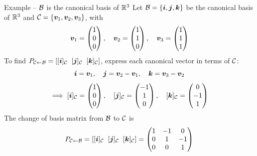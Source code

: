 \documentclass[aspectratio=169]{beamer}\usepackage[]{graphicx}\usepackage[]{xcolor}
\begin{document}
\begin{frame}{Example -- $\mathcal{B}$ is the canonical basis of $\mathbb{R}^3$}
Let $\mathcal{B}=\{\bm{i},\bm{j},\bm{k}\}$ be the canonical basis of $\mathbb{R}^3$ and $\mathcal{C}=\{\bm{v}_1,\bm{v}_2,\bm{v}_3\}$, with
\[
\bm{v}_1 = \begin{pmatrix} 1 \\ 0 \\ 0 \end{pmatrix}, \quad
\bm{v}_2 = \begin{pmatrix} 1 \\ 1 \\ 0 \end{pmatrix}, \quad
\bm{v}_3 = \begin{pmatrix} 1 \\ 1 \\ 1 \end{pmatrix}
\]
\vfill
To find $P_{\mathcal{C}\leftarrow\mathcal{B}} = [[\bm{i}]_{\mathcal{C}} \;\; [\bm{j}]_{\mathcal{C}} \;\; [\bm{k}]_{\mathcal{C}}]$, express each canonical vector in terms of $\mathcal{C}$:
\[
\bm{i} = \bm{v}_1, \quad
\bm{j} = \bm{v}_2 - \bm{v}_1, \quad
\bm{k} = \bm{v}_3 - \bm{v}_2
\]
\[
\implies [\bm{i}]_{\mathcal{C}} = \begin{pmatrix} 1 \\ 0 \\ 0 \end{pmatrix}, \quad
[\bm{j}]_{\mathcal{C}} = \begin{pmatrix} -1 \\ 1 \\ 0 \end{pmatrix}, \quad
[\bm{k}]_{\mathcal{C}} = \begin{pmatrix} 0 \\ -1 \\ 1 \end{pmatrix}
\]
\vfill
The change of basis matrix from $\mathcal{B}$ to $\mathcal{C}$ is
\[
P_{\mathcal{C}\leftarrow\mathcal{B}} = [[\bm{i}]_{\mathcal{C}} \;\; [\bm{j}]_{\mathcal{C}} \;\; [\bm{k}]_{\mathcal{C}}] = \begin{pmatrix} 1 & -1 & 0 \\ 0 & 1 & -1 \\ 0 & 0 & 1 \end{pmatrix}
\]
\end{frame}
\end{document}
